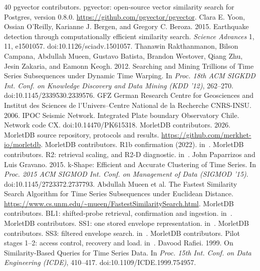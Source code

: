 \documentclass[sigconf]{acmart}
\newcommand{\M}{MorletDB}
\begin{document}
\fi
\label{sec:references}
\begin{thebibliography}{40}\small
{} pgvector contributors. pgvector: open-source vector similarity search for Postgres, version 0.8.0. \url{https://github.com/pgvector/pgvector}.
 Clara E. Yoon, Ossian O'Reilly, Karianne J. Bergen, and Gregory C. Beroza. 2015. Earthquake detection through computationally efficient similarity search. \emph{Science Advances} 1, 11, e1501057. doi:10.1126/sciadv.1501057.
 Thanawin Rakthanmanon, Bilson Campana, Abdullah Mueen, Gustavo Batista, Brandon Westover, Qiang Zhu, Jesin Zakaria, and Eamonn Keogh. 2012. Searching and Mining Trillions of Time Series Subsequences under Dynamic Time Warping. In \emph{Proc. 18th ACM SIGKDD Int. Conf. on Knowledge Discovery and Data Mining (KDD '12)}, 262--270. doi:10.1145/2339530.2339576.
 GFZ German Research Centre for Geosciences and Institut des Sciences de l'Univers--Centre National de la Recherche CNRS-INSU. 2006. IPOC Seismic Network. Integrated Plate boundary Observatory Chile. Network code CX. doi:10.14470/PK615318.
 \M{} contributors. 2026. \M{} source repository, protocols and results. \url{https://github.com/merkhet-io/morletdb}.
 \M{} contributors. R1b confirmation (2022).  in~\cite{repo}.
 \M{} contributors. R2: retrieval scaling, and R2-D diagnostic.  in~\cite{repo}.
 John Paparrizos and Luis Gravano. 2015. k-Shape: Efficient and Accurate Clustering of Time Series. In \emph{Proc. 2015 ACM SIGMOD Int. Conf. on Management of Data (SIGMOD '15)}. doi:10.1145/2723372.2737793.
 Abdullah Mueen et al. The Fastest Similarity Search Algorithm for Time Series Subsequences under Euclidean Distance. \url{https://www.cs.unm.edu/~mueen/FastestSimilaritySearch.html}.
 \M{} contributors. BL1: shifted-probe retrieval, confirmation and ingestion.  in~\cite{repo}.
 \M{} contributors. SS1: one stored envelope representation.  in~\cite{repo}.
 \M{} contributors. SS3: filtered envelope search.  in~\cite{repo}.
 \M{} contributors. Pilot stages 1--2: access control, recovery and load.  in~\cite{repo}.
 Davood Rafiei. 1999. On Similarity-Based Queries for Time Series Data. In \emph{Proc. 15th Int. Conf. on Data Engineering (ICDE)}, 410--417. doi:10.1109/ICDE.1999.754957.

\end{thebibliography}
\end{document}
